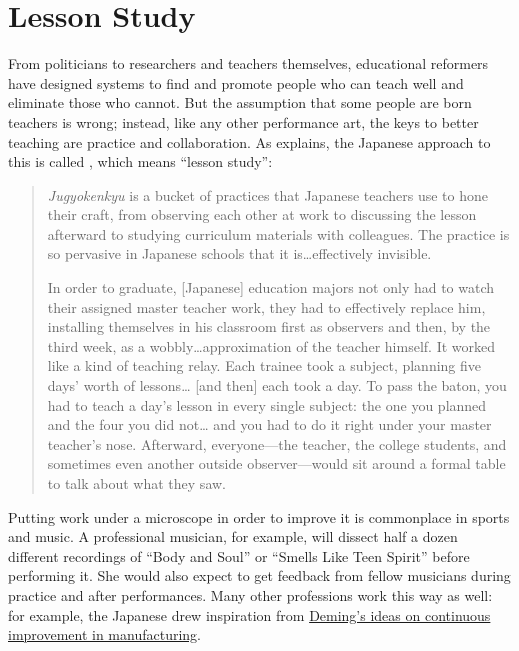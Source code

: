 \section{Lesson Study}\label{s:performance-jugyokenkyu}

From politicians to researchers and teachers themselves, educational
reformers have designed systems to find and promote people who can
teach well and eliminate those who cannot. But the assumption that
some people are born teachers is wrong; instead, like any other
performance art, the keys to better teaching are practice and
collaboration.  As \cite{Gree2014} explains, the Japanese approach to
this is called , which means
``lesson study'':

\begin{quote}

  \emph{Jugyokenkyu} is a bucket of practices that Japanese teachers
  use to hone their craft, from observing each other at work to
  discussing the lesson afterward to studying curriculum materials
  with colleagues. The practice is so pervasive in Japanese schools
  that it is{\ldots}effectively invisible.

  In order to graduate, {[}Japanese{]} education majors not only had
  to watch their assigned master teacher work, they had to effectively
  replace him, installing themselves in his classroom first as
  observers and then, by the third week, as a
  wobbly{\ldots}approximation of the teacher himself. It worked like a
  kind of teaching relay. Each trainee took a subject, planning five
  days' worth of lessons{\ldots} {[}and then{]} each took a day. To
  pass the baton, you had to teach a day's lesson in every single
  subject: the one you planned and the four you did not{\ldots} and
  you had to do it right under your master teacher's nose.  Afterward,
  everyone---the teacher, the college students, and sometimes even
  another outside observer---would sit around a formal table to talk
  about what they saw.

\end{quote}

Putting work under a microscope in order to improve it is commonplace
in sports and music. A professional musician, for example, will
dissect half a dozen different recordings of ``Body and Soul'' or
``Smells Like Teen Spirit'' before performing it.  She would also
expect to get feedback from fellow musicians during practice and after
performances.  Many other professions work this way as well: for
example, the Japanese drew inspiration from
\href{https://en.wikipedia.org/wiki/W.\_Edwards\_Deming}{Deming's
  ideas on continuous improvement in manufacturing}.

